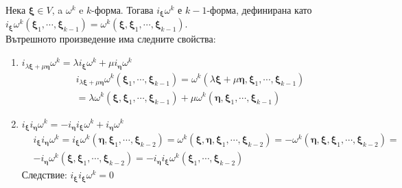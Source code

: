 \documentclass[12pt]{article}
\newcommand\myxi[0]{\boldsymbol{\xi}}
\newcommand\myeta[0]{\boldsymbol{\eta}}
\begin{document}
\begin{large}
Нека $\myxi \in V$, a $\omega^k$ e $k$-форма. Тогава $i_{\myxi}\omega^k$ е $k-1$-форма, дефинирана като $i_{\myxi}\omega^k(\myxi_1,\cdots,\myxi_{k-1})=\omega^k(\myxi,\myxi_1,\cdots,\myxi_{k-1})$. \\
Вътрешното произведение има следните свойства:
\begin{enumerate}
  \item $i_{\lambda\myxi+\mu\myeta}\omega^k=\lambda i_{\myxi}\omega^k + \mu i_{\myeta}\omega^k$ \\
  \begin{align*}
    &i_{\lambda\myxi+\mu\myeta}\omega^k(\myxi_1,\cdots,\myxi_{k-1})=\omega^k(\lambda\myxi+\mu\myeta,\myxi_1,\cdots,\myxi_{k-1}) \\
    &=\lambda\omega^k(\myxi,\myxi_1,\cdots,\myxi_{k-1})+\mu\omega^k(\myeta,\myxi_1,\cdots,\myxi_{k-1})
  \end{align*}
  \item $i_{\myxi}i_{\myeta}\omega^k=-i_{\myeta}i_{\myxi}\omega^k+i_{\myeta}\omega^k$
  \begin{align*}
    &i_{\myxi}i_{\myeta}\omega^k=i_{\myxi}\omega^k(\myeta,\myxi_1,\cdots,\myxi_{k-2})
    =\omega^k(\myxi,\myeta,\myxi_1,\cdots,\myxi_{k-2})=-\omega^k(\myeta,\myxi,\myxi_1,\cdots,\myxi_{k-2})=\\
    &-i_{\myeta}\omega^k(\myxi,\myxi_1,\cdots,\myxi_{k-2})=-i_{\myeta}i_{\myxi}\omega^k(\myxi_1,\cdots,\myxi_{k-2})
  \end{align*}
  Следствие: $i_{\myxi}i_{\myxi}\omega^k=0$


\end{enumerate}
\end{large}
\end{document}
